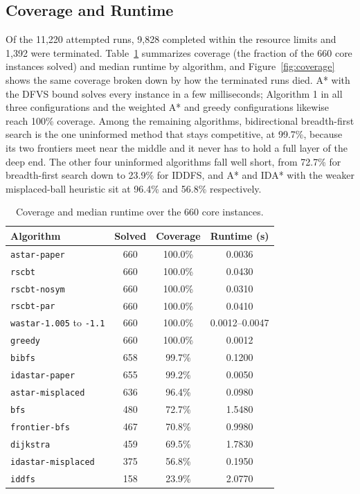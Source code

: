 \documentclass[letterpaper]{article}
\begin{document}
\subsection{Coverage and Runtime}

Of the 11,220 attempted runs, 9,828 completed within the resource limits
and 1,392 were terminated. Table~\ref{tab:coverage} summarizes coverage
(the fraction of the 660 core instances solved) and median runtime by
algorithm, and Figure~\ref{fig:coverage} shows the same coverage broken down
by how the terminated runs died. A* with the DFVS bound solves every instance in a few
milliseconds; Algorithm 1 in all three configurations and the weighted A*
and greedy configurations likewise reach 100\% coverage.
Among the remaining algorithms, bidirectional breadth-first search is the
one uninformed method that stays competitive, at 99.7\%, because its two
frontiers meet near the middle and it never has to hold a full layer of the
deep end. The other four uninformed algorithms fall well short, from 72.7\%
for breadth-first search down to 23.9\% for IDDFS, and A* and IDA* with the
weaker misplaced-ball heuristic sit at 96.4\% and 56.8\% respectively.

\begin{table}[t]
\centering
\footnotesize
\caption{Coverage and median runtime over the 660 core instances.}
\label{tab:coverage}
\begin{tabular}{lccc}
\hline
Algorithm & Solved & Coverage & Runtime (s) \\
\hline
\texttt{astar-paper} & 660 & 100.0\% & 0.0036 \\
\texttt{rscbt} & 660 & 100.0\% & 0.0430 \\
\texttt{rscbt-nosym} & 660 & 100.0\% & 0.0310 \\
\texttt{rscbt-par} & 660 & 100.0\% & 0.0410 \\
\texttt{wastar-1.005} to \texttt{-1.1} & 660 & 100.0\% & 0.0012--0.0047 \\
\texttt{greedy} & 660 & 100.0\% & 0.0012 \\
\texttt{bibfs} & 658 & 99.7\% & 0.1200 \\
\texttt{idastar-paper} & 655 & 99.2\% & 0.0050 \\
\texttt{astar-misplaced} & 636 & 96.4\% & 0.0980 \\
\texttt{bfs} & 480 & 72.7\% & 1.5480 \\
\texttt{frontier-bfs} & 467 & 70.8\% & 0.9980 \\
\texttt{dijkstra} & 459 & 69.5\% & 1.7830 \\
\texttt{idastar-misplaced} & 375 & 56.8\% & 0.1950 \\
\texttt{iddfs} & 158 & 23.9\% & 2.0770 \\
\hline
\end{tabular}
\end{table}
\end{document}
